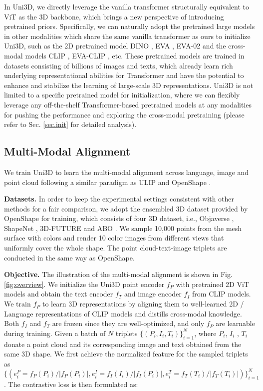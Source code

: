 \documentclass{article} \usepackage{iclr2024_conference,times}
\def\Ours{Uni3D\xspace}
\begin{document}
In \Ours, we directly leverage the vanilla transformer structurally equivalent to ViT as the 3D backbone, which brings a new perspective of introducing pretrained priors. Specifically, we can naturally adopt the pretrained large models in other modalities which share the same vanilla transformer as ours to initialize \Ours, such as the 2D pretrained model DINO \citep{caron2021emerging}, EVA \citep{fang2023eva}, EVA-02 \citep{fang2023eva02} and the cross-modal models CLIP \citep{radford2021learning}, EVA-CLIP \citep{sun2023eva}, etc. These pretrained models are trained in datasets consisting of billions of images and texts, which already learn rich underlying representational abilities for Transformer and have the potential to enhance and stabilize the learning of large-scale 3D representations. 
\Ours is not limited to a specific pretrained model for initialization, where we can flexibly leverage any off-the-shelf Transformer-based pretrained models at any modalities for pushing the performance and exploring the cross-modal pretraining (please refer to Sec. \ref{sec.init} for detailed analysis).

\subsection{Multi-Modal Alignment}
\label{sec.m2}

We train \Ours to learn the multi-modal alignment across language, image and point cloud following a similar paradigm as ULIP \citep{xue2023ulip} and OpenShape \citep{liu2023openshape}. 

\textbf{Datasets.} In order to keep the experimental settings consistent with other methods for a fair comparison, we adopt the ensembled 3D dataset provided by OpenShape for training, which consists of four 3D dataset, i.e., Objaverse \citep{deitke2023objaverse}, ShapeNet \citep{chang2015shapenet}, 3D-FUTURE \citep{fu20213d} and ABO \citep{collins2022abo}. We sample 10,000 points from the mesh surface with colors and render 10 color images from different views that uniformly cover the whole shape. The point cloud-text-image triplets are conducted in the same way as OpenShape.

\textbf{Objective.} The illustration of the multi-modal alignment is shown in Fig. \ref{fig:overview}. We initialize the \Ours point encoder $f_P$ with pretrained 2D ViT models and obtain the text encoder $f_T$ and image encoder $f_I$ from CLIP models. We train $f_P$ to learn 3D representations by aligning them to well-learned 2D / Language representations of CLIP models and distills cross-modal knowledge. Both $f_I$ and $f_T$ are frozen since they are well-optimized, and only $f_P$ are learnable during training. Given a batch of $N$ triplets $\{(P_i, I_i, T_i)\}_{i=1}^N$, where $P_i$, $I_i$ , $T_i$ donate a point cloud and its corresponding image and text obtained from the same 3D shape. We first achieve the normalized feature for the sampled triplets as $\{(e_i^P=f_P(P_i)/|f_P(P_i)|, e_i^I=f_I(I_i)/|f_I(P_i)|, e_i^T=f_T(T_i)/|f_T(T_i)|)\}_{i=1}^N$. The contrastive loss is then formulated as:
\end{document}
